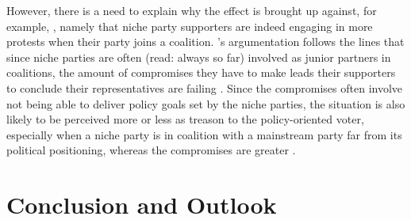 However, there is a need to explain why the effect \cite[see 31]{nonnemacher2023} is brought up against, for example, \cite{torcal2016}, namely that niche party supporters are indeed engaging in more protests when their party joins a coalition. \cite{nonnemacher2023}'s argumentation follows the lines that since niche parties are often (read: always so far) involved as junior partners in coalitions, the amount of compromises they have to make leads their supporters to conclude their representatives are failing \parencite[see 31]{nonnemacher2023}. Since the compromises often involve not being able to deliver policy goals set by the niche parties, the situation is also likely to be perceived more or less as treason to the policy-oriented voter, especially when a niche party is in coalition with a mainstream party far from its political positioning, whereas the compromises are greater \parencite[see 32]{nonnemacher2023}.





%
%
%
\chapter{Conclusion and Outlook} \label{chap:Conclusion and Outlook} %


\printbibliography

